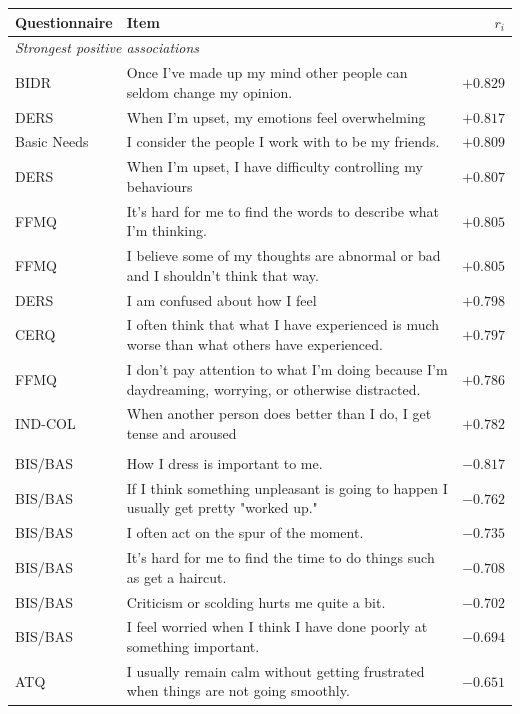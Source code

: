 \begin{table}[!t]
\centering\small
\begin{tabular}{@{}p{}p{}r@{}}
\toprule
Questionnaire & Item & $r_i$ \\
\midrule
\multicolumn{3}{l}{\textit{Strongest positive associations}} \\
BIDR & Once I’ve made up my mind other people can seldom change my opinion. & $+0.829$ \\
DERS & When I’m upset, my emotions feel overwhelming & $+0.817$ \\
Basic Needs & I consider the people I work with to be my friends. & $+0.809$ \\
DERS & When I’m upset, I have difficulty controlling my behaviours & $+0.807$ \\
FFMQ & It’s hard for me to find the words to describe what I’m thinking. & $+0.805$ \\
FFMQ & I believe some of my thoughts are abnormal or bad and I shouldn’t think that way. & $+0.805$ \\
DERS & I am confused about how I feel & $+0.798$ \\
CERQ & I often think that what I have experienced is much worse than what others have experienced. & $+0.797$ \\
FFMQ & I don’t pay attention to what I’m doing because I’m daydreaming, worrying, or otherwise distracted. & $+0.786$ \\
IND-COL & When another person does better than I do, I get tense and aroused & $+0.782$ \\
\addlinespace
\multicolumn{3}{l}{\textit{Strongest negative associations}} \\
BIS/BAS & How I dress is important to me. & $-0.817$ \\
BIS/BAS & If I think something unpleasant is going to happen I usually get pretty "worked up." & $-0.762$ \\
BIS/BAS & I often act on the spur of the moment. & $-0.735$ \\
BIS/BAS & It's hard for me to find the time to do things such as get a haircut. & $-0.708$ \\
BIS/BAS & Criticism or scolding hurts me quite a bit. & $-0.702$ \\
BIS/BAS & I feel worried when I think I have done poorly at something important. & $-0.694$ \\
ATQ & I usually remain calm without getting frustrated when things are not going smoothly. & $-0.651$ \\

\end{tabular}
\end{table}
